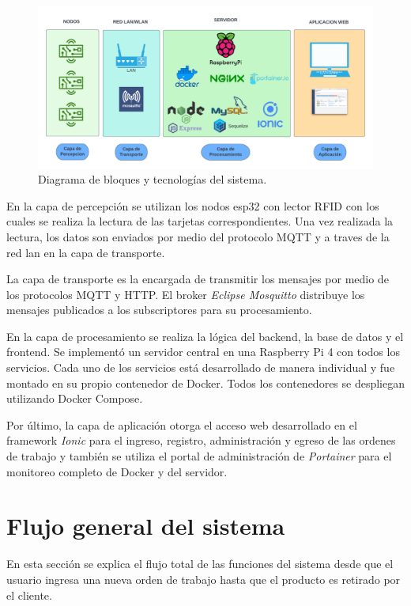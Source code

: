 \begin{figure}[ht]
	\centering
	\includegraphics[scale=.25]{./Figures/diagramabloques.png}
	\caption{Diagrama de bloques y tecnologías del sistema.}
	\label{fig:diagramabloques}
\end{figure}


En la capa de percepción se utilizan los nodos esp32 con lector RFID con los cuales se realiza la lectura de las tarjetas correspondientes. Una vez realizada la lectura, los datos son enviados por medio del protocolo MQTT y a traves de la red lan en la capa de transporte. 

La capa de transporte es la encargada de transmitir los mensajes por medio de los protocolos MQTT y HTTP. El broker \textit{Eclipse Mosquitto} distribuye los mensajes publicados a los subscriptores para su procesamiento.

En la capa de procesamiento se realiza la lógica del backend, la base de datos y el frontend. Se implementó un servidor central en una Raspberry Pi 4 con todos los servicios. Cada uno de los servicios está desarrollado de manera individual y fue montado en su propio contenedor de Docker. Todos los contenedores se despliegan utilizando Docker Compose.

Por último, la capa de aplicación otorga el acceso web desarrollado en el framework \textit{Ionic} para el ingreso, registro, administración y egreso de las ordenes de trabajo y también se utiliza el portal de administración de \textit{Portainer} para el monitoreo completo de Docker y del servidor.


\section{Flujo general del sistema}
\label{sec:flujogeneral}
En esta sección se explica el flujo total de las funciones del sistema desde que el usuario ingresa una nueva orden de trabajo hasta que el producto es retirado por el cliente.

